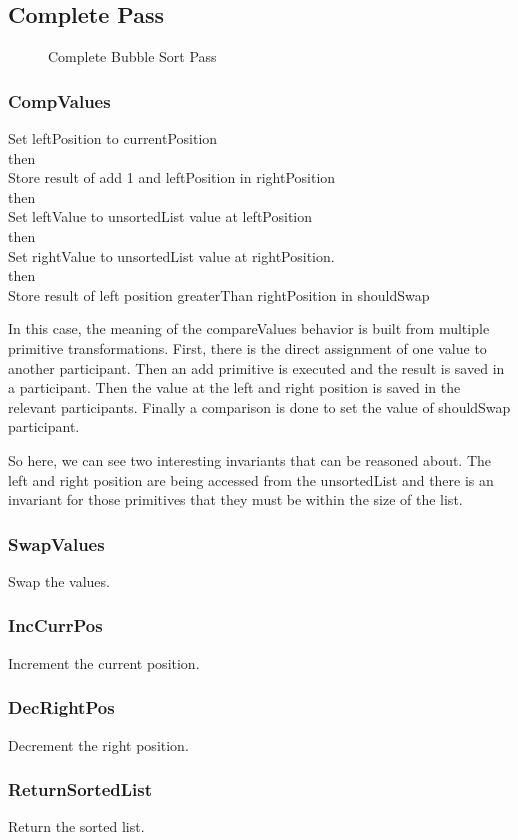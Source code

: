\subsection{Complete Pass}

\begin{figure}[htbp]
    \centering
    
    \caption{Complete Bubble Sort Pass}
    \label{fig:complete_pass}
\end{figure}

\subsubsection{CompValues}
\begin{greyquote}
    Set leftPosition to currentPosition\\
    then\\
    Store result of add 1 and leftPosition in rightPosition\\
    then\\
    Set leftValue to unsortedList value at leftPosition\\
    then\\
    Set rightValue to unsortedList value at rightPosition.\\
    then\\
    Store result of left position greaterThan rightPosition in shouldSwap
\end{greyquote}

In this case, the meaning of the compareValues behavior is built from multiple primitive transformations. First, there is the direct assignment of one value to another participant. Then an add primitive is executed and the result is saved in a participant. Then the value at the left and right position is saved in the relevant participants. Finally a comparison is done to set the value of shouldSwap participant.

So here, we can see two interesting invariants that can be reasoned about. The left and right position are being accessed from the unsortedList and there is an invariant for those primitives that they must be within the size of the list. 

\subsubsection{SwapValues}
Swap the values.

\subsubsection{IncCurrPos}
Increment the current position.

\subsubsection{DecRightPos}
Decrement the right position.

\subsubsection{ReturnSortedList}
Return the sorted list.